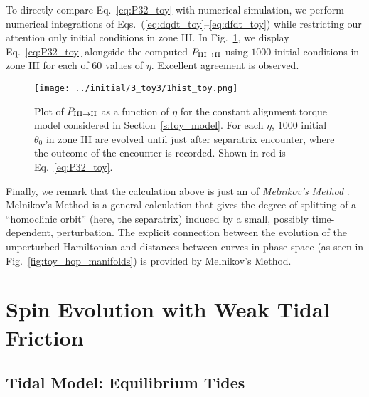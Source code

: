 \documentclass[
        fleqn,
        usenatbib,
        referee,
    ]{mnras}
\newlength{\colummwidth}
\begin{document}
To directly compare Eq.~\eqref{eq:P32_toy} with numerical simulation, we perform
numerical integrations of Eqs.~(\ref{eq:dqdt_toy}--\ref{eq:dfdt_toy}) while
restricting our attention only initial conditions in zone III\@.
In Fig.~\ref{fig:1hist_toy}, we display Eq.~\eqref{eq:P32_toy} alongside the
computed $P_{\rm III \to II}$ using $1000$ initial conditions in zone III for
each of $60$ values of $\eta$. Excellent agreement is observed.
\begin{figure}
    \centering
    \texttt{[image: ../initial/3\_toy3/1hist\_toy.png]}
    \caption{Plot of $P_{\rm III \to II}$ as a function of $\eta$ for the
    constant alignment torque model considered in Section~\ref{s:toy_model}. For
    each $\eta$, $1000$ initial $\theta_0$ in zone III are evolved until just
    after separatrix encounter, where the outcome of the encounter is recorded.
    Shown in red is Eq.~\eqref{eq:P32_toy}.}\label{fig:1hist_toy}
\end{figure}

Finally, we remark that the calculation above is just an of \emph{Melnikov's
Method} \citep{g_and_h}. Melnikov's Method is a general calculation that gives
the degree of splitting of a ``homoclinic orbit'' (here, the separatrix) induced
by a small, possibly time-dependent, perturbation. The explicit connection
between the evolution of the unperturbed Hamiltonian and distances between
curves in phase space (as seen in Fig.~\ref{fig:toy_hop_manifolds}) is provided by
Melnikov's Method.

\section{Spin Evolution with Weak Tidal Friction}\label{s:full_tide_prob}

\subsection{Tidal Model: Equilibrium Tides}\label{ss:weaktide}
\end{document}
